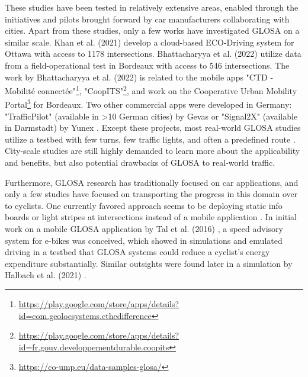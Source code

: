 These studies have been tested in relatively extensive areas, enabled through the initiatives and pilots brought forward by car manufacturers collaborating with cities. Apart from these studies, only a few works have investigated GLOSA on a similar scale. Khan et al. (2021) \cite{khan_eco-drive_2021} develop a cloud-based ECO-Driving system for Ottawa with access to 1178 intersections. Bhattacharyya et al. (2022) \cite{bhattacharyya_assessing_2022} utilize data from a field-operational test in Bordeaux with access to 546 intersections. The work by Bhattacharyya et al. (2022) \cite{bhattacharyya_assessing_2022} is related to the mobile apps "CTD - Mobilité connectée"\footnote{\url{https://play.google.com/store/apps/details?id=com.geolocsystems.cthedifference}}, "CoopITS"\footnote{\url{https://play.google.com/store/apps/details?id=fr.gouv.developpementdurable.coopits}}, and work on the Cooperative Urban Mobility Portal\footnote{\url{https://co-ump.eu/data-samples-glosa/}} for Bordeaux. Two other commercial apps were developed in Germany: "TrafficPilot" (available in >10 German cities) by Gevas or "Signal2X" (available in Darmstadt) by Yunex \cite{yunex_traffic_v2x-kommunikation_2023}. Except these projects, most real-world GLOSA studies utilize a testbed with few turns, few traffic lights, and often a predefined route \cite{iglesias_i2v_2008, schweiger_elisatm_2011, raubitschek_predictive_2011, koukoumidis_signalguru_2011, koukoumidis_leveraging_2012, hao_eco-approach_2019, fickas_fast_2019, chen_developing_2022}. City-scale studies are still highly demanded to learn more about the applicability and benefits, but also potential drawbacks of GLOSA to real-world traffic.

Furthermore, GLOSA research has traditionally focused on car applications, and only a few studies have focused on transporting the progress in this domain over to cyclists. One currently favored approach seems to be deploying static info boards or light stripes at intersections instead of a mobile application \cite{lu_enhancement_2018}. In initial work on a mobile GLOSA application by Tal et al. (2016) \cite{tal_vehicular-communications-based_2016}, a speed advisory system for e-bikes was conceived, which showed in simulations and emulated driving in a testbed that GLOSA systems could reduce a cyclist's energy expenditure substantially. Similar outsights were found later in a simulation by Halbach et al. (2021) \cite{halbach_cooperative_2021}. 

